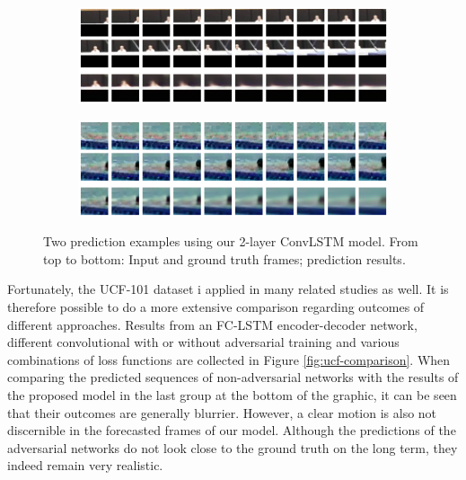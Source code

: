 \begin{figure}[h!tb]
\centering
\begin{subfigure}{0.49\textwidth}
  \centering
  \includegraphics[width=0.92\linewidth]{figures/pred/ucf/random/pred-00.png}
  \caption{}
  \label{fig:ucf-random1a}
  \vspace{.1cm}
\end{subfigure}
\begin{subfigure}{0.49\textwidth}
  \centering
  \includegraphics[width=0.92\linewidth]{figures/pred/ucf/random/pred-04.png}
  \caption{}
  \label{fig:ucf-random1b}
  \vspace{.1cm}
\end{subfigure}
\caption[Prediction Samples on UCF-101]{Two prediction examples using our 2-layer ConvLSTM model. From top to bottom: Input and ground truth frames; prediction results.}
\label{fig:ucf-random1}
\end{figure}

Fortunately, the UCF-101 dataset i applied in many related studies as well. It is therefore possible to do a more extensive comparison regarding outcomes of different approaches. Results from an FC-LSTM encoder-decoder network, different convolutional with or without adversarial training and various combinations of loss functions are collected in Figure \ref{fig:ucf-comparison}. When comparing the predicted sequences of non-adversarial networks with the results of the proposed model in the last group at the bottom of the graphic, it can be seen that their outcomes are generally blurrier. However, a clear motion is also not discernible in the forecasted frames of our model. Although the predictions of the adversarial networks do not look close to the ground truth on the long term, they indeed remain very realistic.

